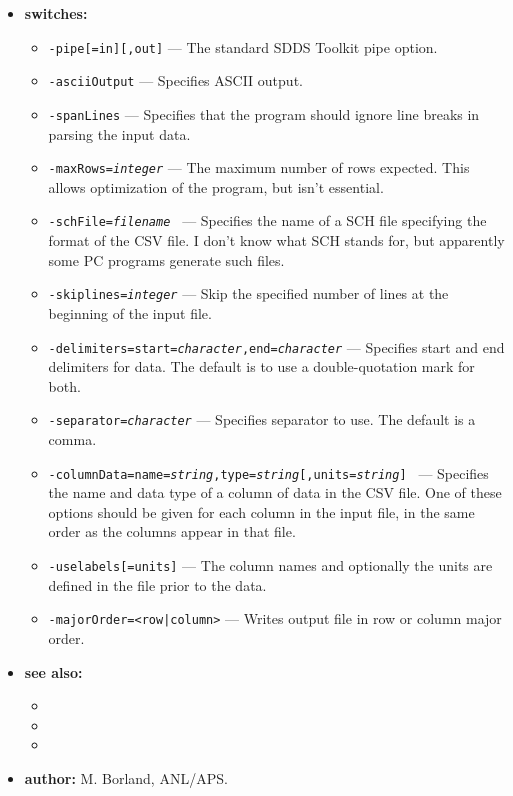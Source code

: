 \begin{itemize}
\item {\bf switches:}
    \begin{itemize}
    \item {\tt -pipe[=in][,out]} --- The standard SDDS Toolkit pipe option.
    \item {\tt -asciiOutput} --- Specifies ASCII output.
    \item {\tt -spanLines} --- Specifies that the program should ignore line breaks in parsing the 
        input data.
    \item {\tt -maxRows={\em integer}} --- The maximum number of rows expected.  This allows
        optimization of the program, but isn't essential.
    \item {\tt -schFile={\em filename} } --- Specifies the name of a SCH file specifying the
        format of the CSV file.  I don't know what SCH stands for, but apparently some PC
        programs generate such files.
    \item {\tt -skiplines={\em integer}} --- Skip the specified number of lines at the beginning 
        of the input file.
    \item {\tt -delimiters=start={\em character},end={\em character}} --- Specifies start and end
        delimiters for data.  The default is to use a double-quotation mark for both.
    \item {\tt -separator={\em character}} --- Specifies separator to use.  The default is a comma.
    \item {\tt -columnData=name={\em string},type={\em string}[,units={\em string}] } --- 
        Specifies the name and data
        type of a column of data in the CSV file.  One of these options should be given for each
        column in the input file, in the same order as the columns appear in that file. 
    \item {\tt -uselabels[=units]} --- The column names and optionally the units are defined in the
        file prior to the data.
    \item {\tt -majorOrder=<row|column>} --- Writes output file in row or column major order.
    \end{itemize}
\item {\bf see also:}
    \begin{itemize}
    \item {}
    \item {}
    \item {}
    \end{itemize}
\item {\bf author:} M. Borland, ANL/APS.
\end{itemize}

